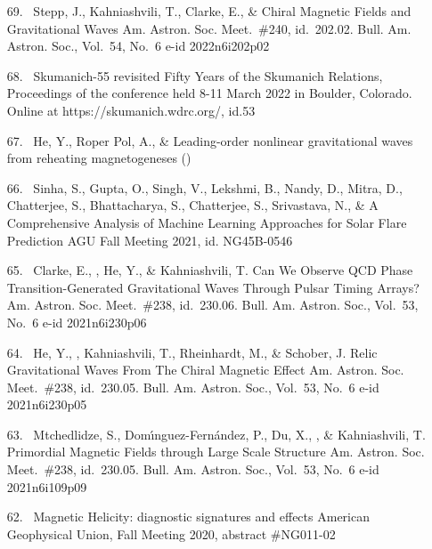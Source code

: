 \begin{itemize}
\item[{69.}~]
Stepp, J., Kahniashvili, T., Clarke, E., \& \Brandenburg{}
{Chiral Magnetic Fields and Gravitational Waves}
{Am. Astron. Soc. Meet.~\#240, id.~202.02. Bull. Am. Astron. Soc., Vol.~54, No.~6 e-id 2022n6i202p02}

\item[{68.}~]
\Brandenburg{}
{Skumanich-55 revisited}
{Fifty Years of the Skumanich Relations, Proceedings of the conference held 8-11 March 2022 in Boulder, Colorado. Online at https://skumanich.wdrc.org/, id.53}

\item[{67.}~]
He, Y., Roper Pol, A., \& \Brandenburg{}
{Leading-order nonlinear gravitational waves from reheating magnetogeneses}
()

\item[{66.}~]
Sinha, S., Gupta, O., Singh, V., Lekshmi, B., Nandy, D., Mitra, D., Chatterjee, S., Bhattacharya, S., Chatterjee, S., Srivastava, N., \& \Brandenburg{}
{A Comprehensive Analysis of Machine Learning Approaches for Solar Flare Prediction}
{AGU Fall Meeting 2021, id. NG45B-0546}

\item[{65.}~]
Clarke, E., \Brandenburg, He, Y., \& Kahniashvili, T.
{Can We Observe QCD Phase Transition-Generated Gravitational Waves Through Pulsar Timing Arrays?}
{Am. Astron. Soc. Meet.~\#238, id.~230.06. Bull. Am. Astron. Soc., Vol.~53, No.~6 e-id 2021n6i230p06}

\item[{64.}~]
He, Y., \Brandenburg, Kahniashvili, T., Rheinhardt, M., \& Schober, J.
{Relic Gravitational Waves From The Chiral Magnetic Effect}
{Am. Astron. Soc. Meet.~\#238, id.~230.05. Bull. Am. Astron. Soc., Vol.~53, No.~6 e-id 2021n6i230p05}

\item[{63.}~]
Mtchedlidze, S., Dom{\'\i}nguez-Fern{\'a}ndez, P., Du, X., \Brandenburg, \& Kahniashvili, T.
{Primordial Magnetic Fields through Large Scale Structure}
{Am. Astron. Soc. Meet.~\#238, id.~230.05. Bull. Am. Astron. Soc., Vol.~53, No.~6 e-id 2021n6i109p09}

\item[{62.}~]
\Brandenburg{}
{Magnetic Helicity: diagnostic signatures and effects}
{American Geophysical Union, Fall Meeting 2020, abstract \#NG011-02}


\end{itemize}
